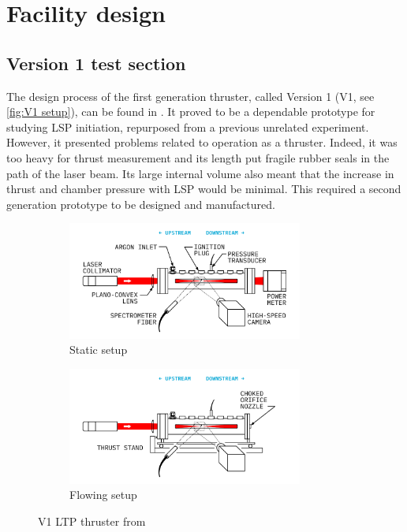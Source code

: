 \chapter{Facility design}

    \section{Version 1 test section} \label{sec:design_v1}

        The design process of the first generation thruster, called Version 1 (V1, see \autoref{fig:V1 setup}), can be found in \textcite{duplayArgonLaserPlasmaThruster2024a}. It proved to be a dependable prototype for studying LSP initiation, repurposed from a previous unrelated experiment. However, it presented problems related to operation as a thruster. Indeed, it was too heavy for thrust measurement and its length put fragile rubber seals in the path of the laser beam. Its large internal volume also meant that the increase in thrust and chamber pressure with LSP would be minimal. This required a second generation prototype to be designed and manufactured.

        \begin{figure}[!ht]
            \centering
            \begin{subfigure}[t]{\textwidth}
                \centering
                \includegraphics[width=0.85\textwidth]{assets/3 design/finalsetup_static.pdf}
                \caption{Static setup}
            \end{subfigure}
            \hfill
            \begin{subfigure}[t]{\textwidth}
                \centering
                \includegraphics[width=0.85\textwidth]{assets/3 design/finalsetup_flowing.pdf}
                \caption{Flowing setup}
            \end{subfigure}
            \caption{V1 LTP thruster from \textcite{duplayArgonLaserPlasmaThruster2024a}}
            \label{fig:V1 setup}
        \end{figure}

